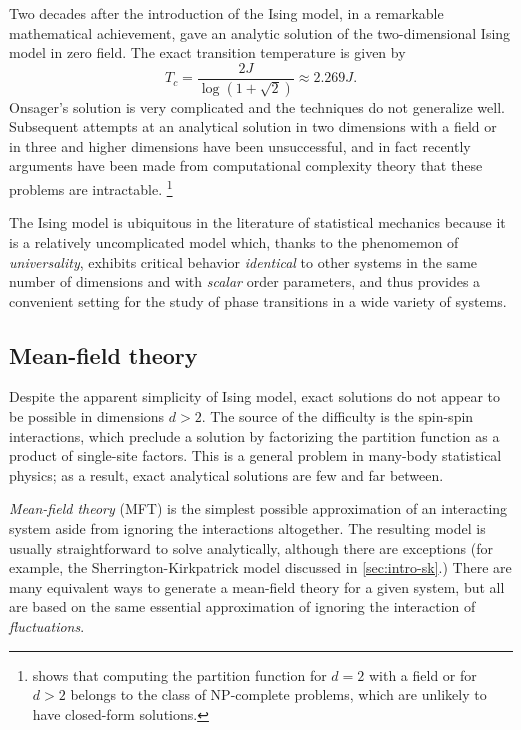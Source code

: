 Two decades after the introduction of the Ising model, in a remarkable
mathematical achievement, \textcite{onsager1944crystal} gave an analytic
solution of the two-dimensional Ising model in zero field. The exact
transition temperature is given by%
\begin{equation}
  T_c = \frac{2J}{\log(1 + \sqrt{2})} \approx 2.269 J.
\end{equation}
Onsager's solution is very complicated and the techniques do not generalize
well. Subsequent attempts at an analytical solution in two dimensions with a
field or in three and higher dimensions have been unsuccessful, and in fact
recently arguments have been made from computational complexity theory that
these problems are intractable.%
\footnote{%
  \textcite{istrail2000statistical} shows that computing the partition function
  for $d=2$ with a field or for $d>2$ belongs to the class of NP-complete
  problems, which are unlikely to have closed-form solutions.
}

The Ising model is ubiquitous in the literature of statistical mechanics
because it is a relatively uncomplicated model which, thanks to the phenomemon
of \emph{universality}, exhibits critical behavior \emph{identical} to other
systems in the same number of dimensions and with \emph{scalar} order
parameters, and thus provides a convenient setting for the study of phase
transitions in a wide variety of systems.


\subsection{Mean-field theory}

Despite the apparent simplicity of Ising model, exact solutions do not appear
to be possible in dimensions $d>2$. The source of the difficulty is the
spin-spin interactions, which preclude a solution by factorizing the partition
function as a product of single-site factors. This is a general problem in
many-body statistical physics; as a result, exact analytical solutions are few
and far between.

\emph{Mean-field theory} (MFT) is the simplest possible approximation of an
interacting system aside from ignoring the interactions altogether. The
resulting model is usually straightforward to solve analytically, although
there are exceptions (for example, the Sherrington-Kirkpatrick model discussed
in \cref{sec:intro-sk}.) There are many equivalent ways to generate a
mean-field theory for a given system, but all are based on the same essential
approximation of ignoring the interaction of \emph{fluctuations}.

